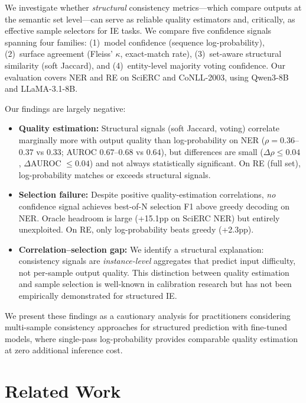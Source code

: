 \documentclass[11pt,a4paper]{article}
\begin{document}
We investigate whether \emph{structural} consistency metrics---which compare outputs at the semantic set level---can serve as reliable quality estimators and, critically, as effective sample selectors for IE tasks. We compare five confidence signals spanning four families: (1)~model confidence (sequence log-probability), (2)~surface agreement (Fleiss' $\kappa$, exact-match rate), (3)~set-aware structural similarity (soft Jaccard), and (4)~entity-level majority voting confidence. Our evaluation covers NER and RE on SciERC and CoNLL-2003, using Qwen3-8B and LLaMA-3.1-8B.

Our findings are largely negative:

\begin{itemize}
\item \textbf{Quality estimation:} Structural signals (soft Jaccard, voting) correlate marginally more with output quality than log-probability on NER ($\rho = 0.36$--$0.37$ vs $0.33$; AUROC $0.67$--$0.68$ vs $0.64$), but differences are small ($\Delta\rho \leq 0.04$, $\Delta$AUROC $\leq 0.04$) and not always statistically significant. On RE (full set), log-probability matches or exceeds structural signals.
\item \textbf{Selection failure:} Despite positive quality-estimation correlations, \emph{no} confidence signal achieves best-of-N selection F1 above greedy decoding on NER. Oracle headroom is large (+15.1pp on SciERC NER) but entirely unexploited. On RE, only log-probability beats greedy (+2.3pp).
\item \textbf{Correlation--selection gap:} We identify a structural explanation: consistency signals are \emph{instance-level} aggregates that predict input difficulty, not per-sample output quality. This distinction between quality estimation and sample selection is well-known in calibration research but has not been empirically demonstrated for structured IE.
\end{itemize}

We present these findings as a cautionary analysis for practitioners considering multi-sample consistency approaches for structured prediction with fine-tuned models, where single-pass log-probability provides comparable quality estimation at zero additional inference cost.

\section{Related Work}
\label{sec:related}
\end{document}
